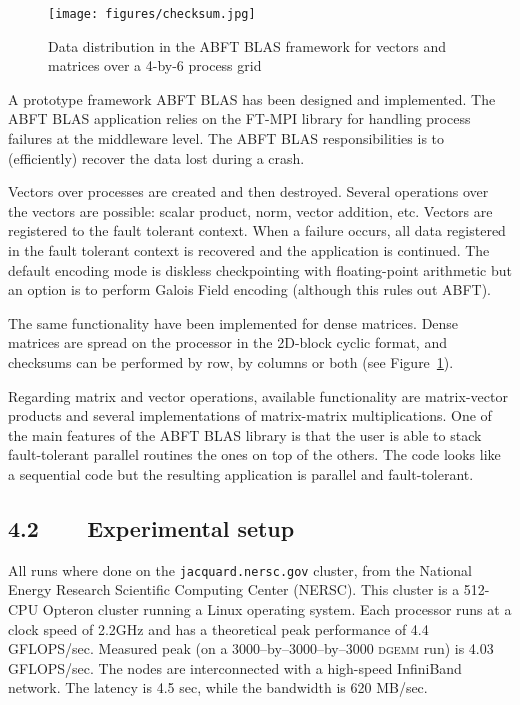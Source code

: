 \documentclass[pdftex,11pt]{article}
\begin{document}
\begin{figure}
  \color{DodgerBlue4}
\begin{center}
    \texttt{[image: figures/checksum.jpg]}
    \caption{\label{fig:datadistribution} \color{black} Data distribution
      in the ABFT BLAS framework for vectors and matrices over a 4-by-6
      process grid }
  \end{center}
\end{figure}

A prototype framework ABFT BLAS has been designed and implemented.
The ABFT BLAS application relies on the FT-MPI library for handling
process failures at the middleware level. The ABFT BLAS
responsibilities is to (efficiently) recover the data lost during a
crash.

Vectors over processes are created and then destroyed. Several
operations over the vectors are possible: scalar product, norm, vector
addition, etc.  Vectors are registered to the fault tolerant
context. When a failure occurs, all data registered in the fault
tolerant context is recovered and the application is continued. The
default encoding mode is diskless checkpointing with floating-point
arithmetic but an option is to perform Galois Field encoding (although
this rules out ABFT).

The same functionality have been implemented for dense matrices. Dense
matrices are spread on the processor in the 2D-block cyclic format,
and checksums can be performed by row, by columns or both (see
Figure~\ref{fig:datadistribution}).

Regarding matrix and vector operations, available functionality are
matrix-vector products and several implementations of matrix-matrix
multiplications. One of the main features of the ABFT BLAS library is
that the user is able to stack fault-tolerant parallel routines the
ones on top of the others. The code looks like a sequential code but
the resulting application is parallel and fault-tolerant.


\subsection*{\color{DodgerBlue4}
4.2~~~~Experimental setup}

All runs where done on the \texttt{jacquard.nersc.gov} cluster, from
the National Energy Research Scientific Computing Center (NERSC). This
cluster is a 512-CPU Opteron cluster running a Linux operating
system. Each processor runs at a clock speed of 2.2GHz and has a
theoretical peak performance of 4.4 GFLOPS/sec. Measured peak (on a
3000--by--3000--by--3000 \textsc{dgemm} run) is 4.03 GFLOPS/sec. The
nodes are interconnected with a high-speed InfiniBand network. The
latency is 4.5 sec, while the bandwidth is 620 MB/sec.
\end{document}

